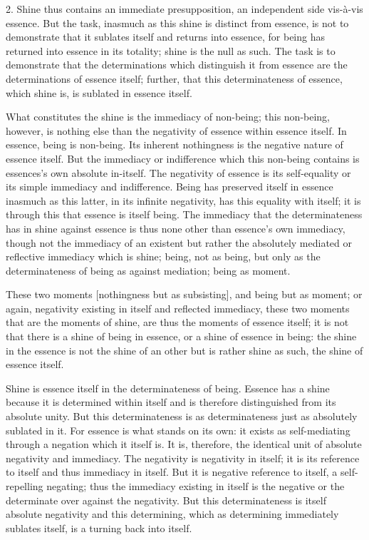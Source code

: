 2. Shine thus contains an immediate presupposition,
an independent side vis-à-vis essence.
But the task, inasmuch as this shine is distinct from essence,
is not to demonstrate that it sublates itself
and returns into essence, for being has returned into essence in its totality;
shine is the null as such.
The task is to demonstrate that the determinations which
distinguish it from essence are the determinations of essence itself;
further, that this determinateness of essence,
which shine is, is sublated in essence itself.

What constitutes the shine is the immediacy of non-being;
this non-being, however, is nothing else than
the negativity of essence within essence itself.
In essence, being is non-being.
Its inherent nothingness is the negative nature of essence itself.
But the immediacy or indifference which this non-being contains is
essences's own absolute in-itself.
The negativity of essence is its self-equality
or its simple immediacy and indifference.
Being has preserved itself in essence inasmuch
as this latter, in its infinite negativity,
has this equality with itself;
it is through this that essence is itself being.
The immediacy that the determinateness has in shine against essence is
thus none other than essence's own immediacy,
though not the immediacy of an existent
but rather the absolutely mediated
or reflective immediacy which is shine;
being, not as being, but only as
the determinateness of being as against mediation;
being as moment.

These two moments [nothingness but as subsisting],
and being but as moment;
or again, negativity existing in itself and reflected immediacy,
these two moments that are the moments of shine,
are thus the moments of essence itself;
it is not that there is a shine of being in essence,
or a shine of essence in being:
the shine in the essence is not the shine of an other
but is rather shine as such, the shine of essence itself.

Shine is essence itself in the determinateness of being.
Essence has a shine because it is determined within itself
and is therefore distinguished from its absolute unity.
But this determinateness is as determinateness
just as absolutely sublated in it.
For essence is what stands on its own:
it exists as self-mediating through a negation which it itself is.
It is, therefore, the identical unit of absolute negativity and immediacy.
The negativity is negativity in itself;
it is its reference to itself and thus immediacy in itself.
But it is negative reference to itself,
a self-repelling negating;
thus the immediacy existing in itself is
the negative or the determinate over against the negativity.
But this determinateness is itself absolute negativity
and this determining, which as determining immediately sublates itself,
is a turning back into itself.

